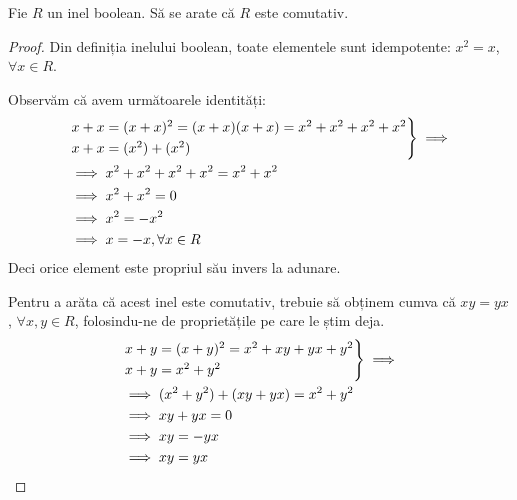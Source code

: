 \begin{exercise}[1.27]
Fie \(R\) un inel boolean. Să se arate că \(R\) este comutativ.
\end{exercise}
\begin{proof}
Din definiția inelului boolean, toate elementele sunt idempotente: \(x^2 = x\), \(\forall x \in R\).

Observăm că avem următoarele identități:
\begin{align*}
    &\begin{rcases*}
    x + x = (x + x)^2 = (x + x)(x + x) = x^2 + x^2 + x^2 + x^2 \\
    x + x = (x^2) + (x^2)
    \end{rcases*} \implies \\
    &\implies x^2 + x^2 + x^2 + x^2 = x^2 + x^2 \\
    &\implies x^2 + x^2 = 0 \\
    &\implies x^2 = -x^2 \\
    &\implies x = -x, \forall x \in R
\end{align*}
Deci orice element este propriul său invers la adunare.

Pentru a arăta că acest inel este comutativ, trebuie să obținem cumva că \(xy = yx\), \(\forall x, y \in R\), folosindu-ne de proprietățile pe care le știm deja.
\begin{align*}
    &\begin{rcases*}
        x + y = (x + y)^2 = x^2 + xy + yx + y^2 \\
        x + y = x^2 + y^2
    \end{rcases*} \implies \\
    &\implies (x^2 + y^2) + (xy + yx) = x^2 + y^2 \\
    &\implies xy + yx = 0 \\
    &\implies xy = -yx \\
    &\implies xy = yx
\end{align*}
\end{proof}

